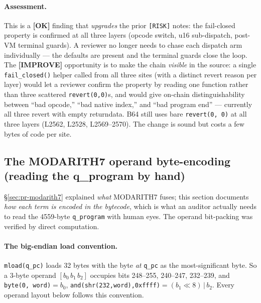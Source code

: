\paragraph{Assessment.} This is a
\textcolor{tracegreen}{\textbf{[OK]}} finding that
\emph{upgrades} the prior \texttt{[RISK]} notes: the fail-closed
property is confirmed at all three layers (opcode switch, u16
sub-dispatch, post-VM terminal guards). A reviewer no longer needs
to chase each dispatch arm individually --- the defaults are
present and the terminal guards close the loop. The
\textcolor{codegenblue}{\textbf{[IMPROVE]}} opportunity is to
make the chain \emph{visible} in the source: a single
\texttt{fail\_closed()} helper called from all three sites (with a
distinct revert reason per layer) would let a reviewer confirm the
property by reading one function rather than three scattered
\texttt{revert(0,0)}s, and would give on-chain distinguishability
between ``bad opcode,'' ``bad native index,'' and ``bad program
end'' --- currently all three revert with empty returndata.
 B64 still uses bare \texttt{revert(0, 0)} at all
three layers (L2562, L2528, L2569--2570). The change is sound
but costs a few bytes of code per site.

\subsection{The MODARITH7 operand byte-encoding (reading the q\_program by hand)}
\label{sec:pr-modarith7-encoding}

§\ref{sec:pr-modarith7} explained \emph{what} MODARITH7 fuses;
this section documents \emph{how each term is encoded in the
bytecode}, which is what an auditor actually needs to read the
4559-byte \texttt{q\_program} with human eyes. The operand
bit-packing was verified by direct computation.

\paragraph{The big-endian load convention.}
\texttt{mload(q\_pc)} loads 32 bytes with the byte \emph{at}
\texttt{q\_pc} as the most-significant byte. So a 3-byte operand
$[b_0\,b_1\,b_2]$ occupies bits 248--255, 240--247, 232--239,
and \texttt{byte(0,\,word)}$=b_0$,
\texttt{and(shr(232,word),0xffff)}$=(b_1\!\ll\!8)\,|\,b_2$.
Every operand layout below follows this convention.

